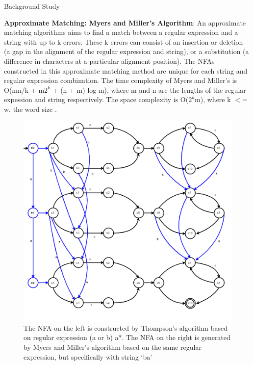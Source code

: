 \documentclass[22pt]{beamer}
\begin{document}
\begin{frame}[fragile]
\begin{textblock}{7.25}
\begin{block}{Background Study}
\vspace{5mm} %

\textbf{Approximate Matching: Myers and Miller's Algorithm}: An approximate matching algorithms aims to find a match between a regular expression and a string with up to k errors. These k errors can consist of an insertion or deletion (a gap in the alignment of the regular expression and string), or a substitution (a difference in characters at a particular alignment position). The NFAs constructed in this approximate matching method are unique for each string and regular expression combination. The time complexity of Myers and Miller's is O(mn/k + m$2^{k}$ + (n + m) log m), where m and n are the lengths of the regular expession and string respectively. The space complexity is O($2^{k}$m), where k $<$= w, the word size \cite{Approx1}.


\begin{figure}
\hspace*{.2in}
\includegraphics[scale=2]{MillerAndMyersAlgorithm.PNG}
\caption{The NFA on the left is constructed by Thompson's algorithm based on regular expression (a or b) a*. The NFA on the right is generated by Myers and Miller's algorithm based on the same regular expression, but specifically with string `ba'}
\end{figure}


\end{block}
\end{textblock}
\end{frame}
\end{document}
